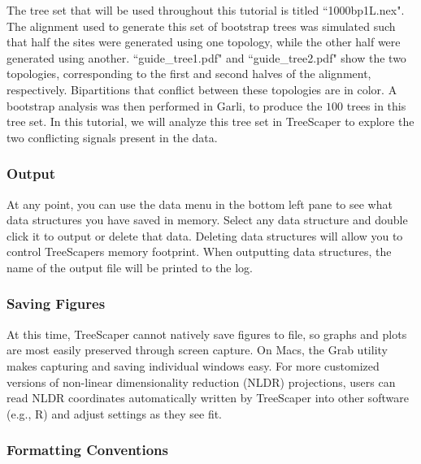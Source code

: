 \documentclass[11pt]{article}
\begin{document}
The tree set that will be used throughout this tutorial is titled ``1000bp1L.nex".  The alignment used to generate this set of bootstrap trees was simulated such that half the sites were generated using one topology, while the other half were generated using another. ``guide\_tree1.pdf" and ``guide\_tree2.pdf" show the two topologies, corresponding to the first and second halves of the alignment, respectively.  Bipartitions that conflict between these topologies are in color.  A bootstrap analysis was then performed in Garli, to produce the $100$ trees in this tree set.  In this tutorial, we will analyze this tree set in TreeScaper to explore the two conflicting signals present in the data. \\


\subsubsection{Output}\label{subsubsect:Output}

At any point, you can use the data menu in the bottom left pane to see what data structures you have saved in memory.  Select any data structure and double click it to output or delete that data. Deleting data structures will allow you to control TreeScapers memory footprint. When outputting data structures, the name of the output file will be printed to the log. \\


\subsubsection{Saving Figures}\label{subsubsect:SavingFigures}

At this time, TreeScaper cannot natively save figures to file, so graphs and plots are most easily preserved through screen capture. On Macs, the Grab utility makes capturing and saving individual windows easy. For more customized versions of non-linear dimensionality reduction (NLDR) projections, users can read NLDR coordinates automatically written by TreeScaper into other software (e.g., R) and adjust settings as they see fit. \\


\subsubsection{Formatting Conventions}\label{subsubsect:Formatting}
\end{document}
